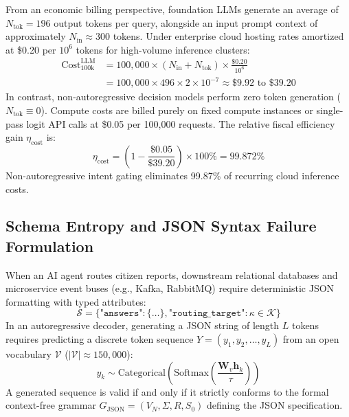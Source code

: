 \documentclass[journal,compsoc]{IEEEtran}
\begin{document}
From an economic billing perspective, foundation LLMs generate an average of $N_{\text{tok}} = 196$ output tokens per query, alongside an input prompt context of approximately $N_{\text{in}} \approx 300$ tokens. Under enterprise cloud hosting rates amortized at \$0.20 per $10^6$ tokens for high-volume inference clusters:
\begin{equation}
\begin{aligned}
\text{Cost}_{\text{100k}}^{\text{LLM}} &= 100{,}000 \times (N_{\text{in}} + N_{\text{tok}}) \times \frac{\$0.20}{10^6} \\
&= 100{,}000 \times 496 \times 2 \times 10^{-7} \approx \$9.92 \text{ to } \$39.20
\end{aligned}
\end{equation}
In contrast, non-autoregressive decision models perform zero token generation ($N_{\text{tok}} \equiv 0$). Compute costs are billed purely on fixed compute instances or single-pass logit API calls at \$0.05 per 100,000 requests. The relative fiscal efficiency gain $\eta_{\text{cost}}$ is:
\begin{equation}
\eta_{\text{cost}} = \left( 1 - \frac{\$0.05}{\$39.20} \right) \times 100\% = 99.872\%
\end{equation}
Non-autoregressive intent gating eliminates 99.87\% of recurring cloud inference costs.

\subsection{Schema Entropy and JSON Syntax Failure Formulation}
When an AI agent routes citizen reports, downstream relational databases and microservice event buses (e.g., Kafka, RabbitMQ) require deterministic JSON formatting with typed attributes:
\begin{equation}
\mathcal{S} = \{ \texttt{"answers"}: \{ \dots \}, \texttt{"routing\_target"}: \kappa \in \mathcal{K} \}
\end{equation}
In an autoregressive decoder, generating a JSON string of length $L$ tokens requires predicting a discrete token sequence $Y = (y_1, y_2, \dots, y_L)$ from an open vocabulary $\mathcal{V}$ ($|\mathcal{V}| \approx 150{,}000$):
\begin{equation}
y_k \sim \text{Categorical}\left(\text{Softmax}\left(\frac{\mathbf{W}_v \mathbf{h}_k}{\tau}\right)\right)
\end{equation}
A generated sequence is valid if and only if it strictly conforms to the formal context-free grammar $G_{\text{JSON}} = (V_N, \Sigma, R, S_0)$ defining the JSON specification.
\end{document}
